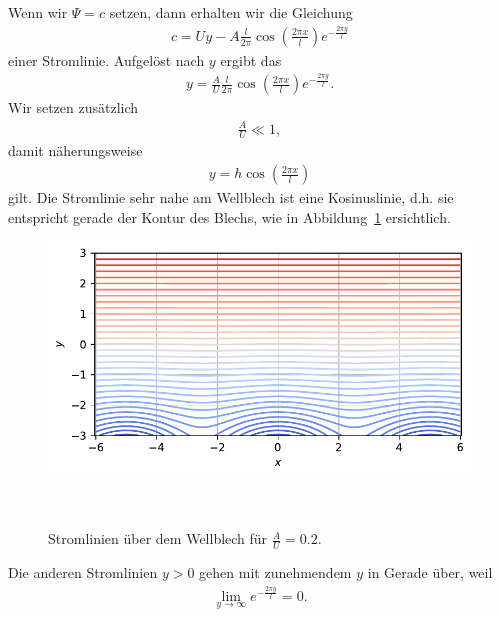 Wenn wir $\Psi = c$ setzen, dann erhalten wir die Gleichung
\begin{align}
    c = U y - A \frac{l}{2 \pi} 
    \cos\left(\frac{2 \pi x}{l}\right) 
    e^{-\frac{2 \pi y}{l}}\label{eq:stromlinie}
\end{align}
einer Stromlinie.
Aufgelöst nach $y$ ergibt das
\begin{align*}
    y
    =
    \frac{A}{U} \frac{l}{2 \pi} 
    \cos\left(\frac{2 \pi x}{l}\right) 
    e^{-\frac{2 \pi y}{l}}.
\end{align*}
Wir setzen zusätzlich 
\begin{align*}
    \frac{A}{U} \ll 1,
\end{align*}
damit näherungsweise
\begin{align*}
    y
    =
    h \cos\left(\frac{2 \pi x}{l}\right)
\end{align*}
gilt.
Die Stromlinie sehr nahe am Wellblech ist eine
Kosinuslinie, d.h. sie entspricht gerade der Kontur
des Blechs, wie in Abbildung~\ref{fig:stromlinien} ersichtlich.
\begin{figure}
    \centering
    \includegraphics[width=\textwidth]{papers/ueberschall/figures/Stromlinien.pdf}
    \caption{Stromlinien über dem Wellblech für $\frac{A}{U}=0.2$.}
    ~\label{fig:stromlinien}  
\end{figure}
Die anderen Stromlinien $y > 0$ gehen mit zunehmendem $y$
in Gerade über, weil
\begin{align*}
    \lim_{y \to \infty}
    e^{-\frac{2 \pi y}{l}}
    =
    0.
\end{align*}

